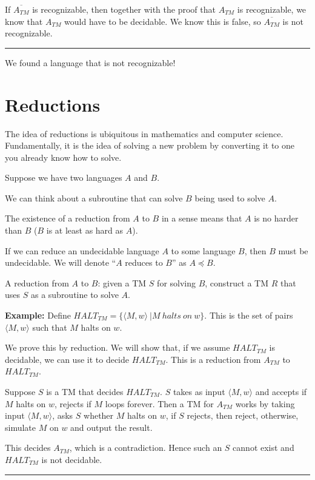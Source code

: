 \documentclass[twoside]{article}
\newenvironment{proof}{{\bf Proof:}}{\hfill\rule{2mm}{2mm}}
\begin{document}

\begin{proof}
	
	If $\overline{A_{TM}}$ is recognizable, then together with the proof that $A_{TM}$ is recognizable, we know that $A_{TM}$ would have to be decidable.  We know this is false, so $\overline{A_{TM}}$ is not recognizable.
\end{proof}


We found a language that is not recognizable!


\section*{Reductions}

The idea of reductions is ubiquitous in mathematics and computer science.  Fundamentally, it is the idea of solving a new problem by converting it to one you already know how to solve.

Suppose we have two languages $A$ and $B$.


We can think about a subroutine that can solve $B$ being used to solve $A$.

The existence of a reduction from $A$ to $B$ in a sense means that $A$ is no harder than $B$ ($B$ is at least as hard as $A$).

If we can reduce an undecidable language $A$ to some language $B$, then $B$ must be undecidable.  We will denote ``$A$ reduces to $B$'' as $A\preceq B$.


A reduction from $A$ to $B$: given a TM $S$ for solving $B$, construct a TM $R$ that uses $S$ as a subroutine to solve $A$.

\textbf{Example:}  Define $HALT_{TM} = \{ \langle M,w \rangle \ | M \ halts \ on \ w  \}$.  This is the set of pairs $\langle M,w\rangle$ such that $M$ halts on $w$.


\begin{proof}
	We prove this by reduction.  We will show that, if we assume $HALT_{TM}$ is decidable, we can use it to decide $HALT_{TM}$.  This is a reduction from $A_{TM}$ to $HALT_{TM}$.
	
	Suppose $S$ is a TM that decides $HALT_{TM}$. $S$ takes as input $\langle M,w \rangle$ and accepts if $M$ halts on $w$, rejects if $M$ loops forever.  Then a TM for $A_{TM}$ works by taking input $\langle M,w \rangle$, asks $S$ whether $M$ halts on $w$, if $S$ rejects, then reject, otherwise, simulate $M$ on $w$ and output the result.
	
	This decides $A_{TM}$, which is a contradiction.  Hence such an $S$ cannot exist and $HALT_{TM}$ is not decidable.
	
	
	
\end{proof}
\end{document}
